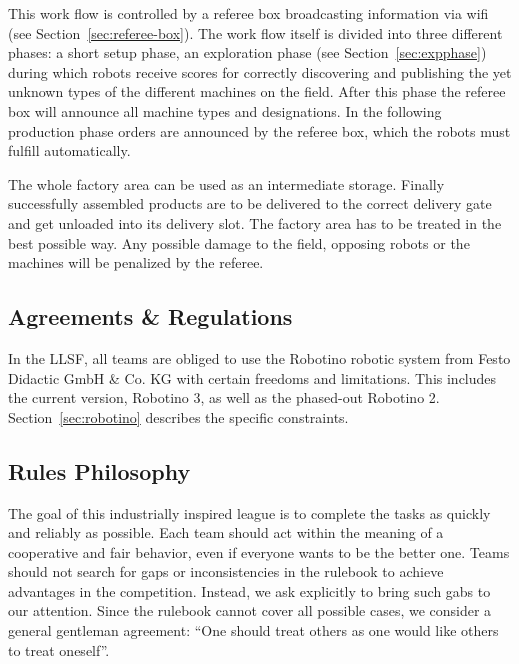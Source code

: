 \documentclass[12pt,twoside]{article}
\newcommand{\refsec}[1]{Section~\ref{#1}}
\begin{document}
This work flow is controlled by a referee box broadcasting information
via wifi (see \refsec{sec:referee-box}). The work flow itself is
divided into three different phases: a short setup phase, an
exploration phase (see \refsec{sec:expphase}) during which robots
receive scores for correctly discovering and publishing the yet
unknown types of the different machines on the field. After this phase
the referee box will announce all machine types and designations. In
the following production phase orders are announced by the referee
box, which the robots must fulfill automatically.

The whole factory area can be used as an intermediate storage. Finally
successfully assembled products are to be delivered to the correct
delivery gate and get unloaded into its delivery slot. The factory
area has to be treated in the best possible way. Any possible damage
to the field, opposing robots or the machines will be penalized by the
referee.

\subsection{Agreements \& Regulations}
\label{sec:agreements}
In the LLSF, all teams are obliged to use the Robotino robotic system
from Festo Didactic GmbH \& Co. KG with certain freedoms and
limitations. This includes the current version, Robotino 3, as well as
the phased-out Robotino 2. \refsec{sec:robotino} describes the
specific constraints.

\subsection{Rules Philosophy}
\label{sec:rules-philosphy}
The goal of this industrially inspired league is to complete the tasks
as quickly and reliably as possible. Each team should act within the
meaning of a cooperative and fair behavior, even if everyone wants to
be the better one. Teams should not search for gaps or inconsistencies
in the rulebook to achieve advantages in the competition. Instead, we
ask explicitly to bring such gabs to our attention. Since the rulebook
cannot cover all possible cases, we consider a general gentleman
agreement: ``One should treat others as one would like others to treat
oneself''.

\end{document}
